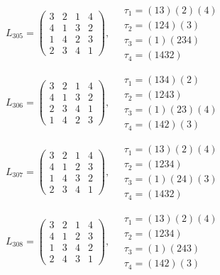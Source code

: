 $L_{305} = \begin{pmatrix} 3 & 2 & 1 & 4 \\ 4 & 1 & 3 & 2 \\ 1 & 4 & 2 & 3 \\ 2 & 3 & 4 & 1 \end{pmatrix}, \quad \begin{matrix} \tau_{1} = (1 3)(2)(4) \\ \tau_{2} = (1 2 4)(3) \\ \tau_{3} = (1)(2 3 4) \\ \tau_{4} = (1 4 3 2) \end{matrix}$

$L_{306} = \begin{pmatrix} 3 & 2 & 1 & 4 \\ 4 & 1 & 3 & 2 \\ 2 & 3 & 4 & 1 \\ 1 & 4 & 2 & 3 \end{pmatrix}, \quad \begin{matrix} \tau_{1} = (1 3 4)(2) \\ \tau_{2} = (1 2 4 3) \\ \tau_{3} = (1)(2 3)(4) \\ \tau_{4} = (1 4 2)(3) \end{matrix}$

$L_{307} = \begin{pmatrix} 3 & 2 & 1 & 4 \\ 4 & 1 & 2 & 3 \\ 1 & 4 & 3 & 2 \\ 2 & 3 & 4 & 1 \end{pmatrix}, \quad \begin{matrix} \tau_{1} = (1 3)(2)(4) \\ \tau_{2} = (1 2 3 4) \\ \tau_{3} = (1)(2 4)(3) \\ \tau_{4} = (1 4 3 2) \end{matrix}$

$L_{308} = \begin{pmatrix} 3 & 2 & 1 & 4 \\ 4 & 1 & 2 & 3 \\ 1 & 3 & 4 & 2 \\ 2 & 4 & 3 & 1 \end{pmatrix}, \quad \begin{matrix} \tau_{1} = (1 3)(2)(4) \\ \tau_{2} = (1 2 3 4) \\ \tau_{3} = (1)(2 4 3) \\ \tau_{4} = (1 4 2)(3) \end{matrix}$

